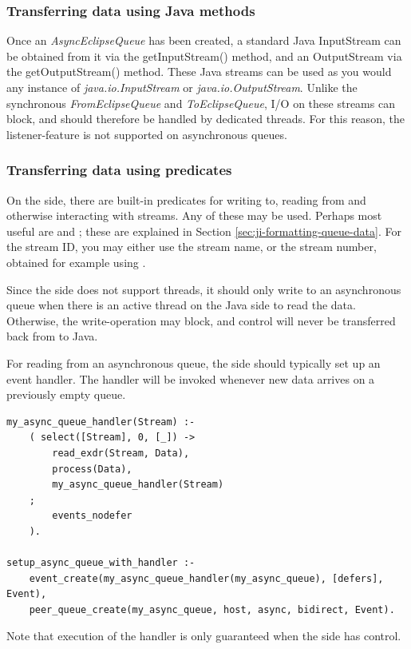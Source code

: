\subsubsection*{Transferring data using Java methods}

Once an {\it AsyncEclipseQueue} has been created, a standard Java
InputStream can be obtained from it via the getInputStream() method,
and an OutputStream via the getOutputStream() method.
These Java streams can be used as you would any instance of {\it
java.io.InputStream} or {\it java.io.OutputStream}.
Unlike the synchronous {\it FromEclipseQueue} and {\it ToEclipseQueue},
I/O on these streams can block, and should therefore be handled by dedicated
threads. For this reason, the listener-feature is not supported on
asynchronous queues.

\subsubsection*{Transferring data using {\eclipse} predicates}

On the {\eclipse} side, there are built-in predicates for writing to,
reading from and otherwise interacting with streams. Any of these may
be used. Perhaps most useful are  and ; these are explained in Section
\ref{sec:ji-formatting-queue-data}. For the stream ID, you may either use the stream name, or the stream number, obtained for example using .

Since the {\eclipse} side does not support threads, it should only write to
an asynchronous queue when there is an active thread on the Java side to
read the data. Otherwise, the write-operation may block, and control will
never be transferred back from {\eclipse} to Java.

For reading from an asynchronous queue, the {\eclipse} side should
typically set up an event handler. The handler will be invoked whenever
new data arrives on a previously empty queue.
\begin{verbatim}
my_async_queue_handler(Stream) :-
    ( select([Stream], 0, [_]) ->
        read_exdr(Stream, Data),
        process(Data),
        my_async_queue_handler(Stream)
    ;
        events_nodefer
    ).

setup_async_queue_with_handler :-
    event_create(my_async_queue_handler(my_async_queue), [defers], Event),
    peer_queue_create(my_async_queue, host, async, bidirect, Event).
\end{verbatim}
Note that execution of the handler is only guaranteed when the {\eclipse}
side has control.

